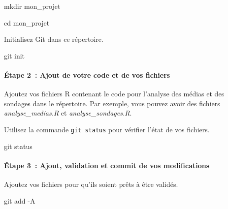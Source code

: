 \documentclass[
  letterpaper,
]{scrbook}
\let\oldparagraph\paragraph
\renewcommand{\paragraph}[1]{\oldparagraph{#1}\mbox{}}
\newenvironment{Shaded}{\begin{snugshade}}{\end{snugshade}}
\newcommand{\AttributeTok}[1]{\textcolor[rgb]{0.40,0.45,0.13}{#1}}
\newcommand{\BuiltInTok}[1]{\textcolor[rgb]{0.00,0.23,0.31}{#1}}
\newcommand{\FunctionTok}[1]{\textcolor[rgb]{0.28,0.35,0.67}{#1}}
\newcommand{\NormalTok}[1]{\textcolor[rgb]{0.00,0.23,0.31}{#1}}
\begin{document}
\begin{Shaded}
\begin{Highlighting}[]
\FunctionTok{mkdir}\NormalTok{ mon\_projet}
\end{Highlighting}
\end{Shaded}

\begin{Shaded}
\begin{Highlighting}[]
\BuiltInTok{cd}\NormalTok{ mon\_projet}
\end{Highlighting}
\end{Shaded}

Initialisez Git dans ce répertoire.

\begin{Shaded}
\begin{Highlighting}[]
\FunctionTok{git}\NormalTok{ init}
\end{Highlighting}
\end{Shaded}

\hypertarget{uxe9tape-2-ajout-de-votre-code-et-de-vos-fichiers}{%
\paragraph{Étape 2~: Ajout de votre code et de vos
fichiers}\label{uxe9tape-2-ajout-de-votre-code-et-de-vos-fichiers}}

Ajoutez vos fichiers R contenant le code pour l'analyse des médias et
des sondages dans le répertoire. Par exemple, vous pouvez avoir des
fichiers \emph{analyse\_medias.R} et \emph{analyse\_sondages.R}.

Utilisez la commande \texttt{git\ status} pour vérifier l'état de vos
fichiers.

\begin{Shaded}
\begin{Highlighting}[]
\FunctionTok{git}\NormalTok{ status}
\end{Highlighting}
\end{Shaded}

\hypertarget{uxe9tape-3-ajout-validation-et-commit-de-vos-modifications}{%
\paragraph{Étape 3~: Ajout, validation et commit de vos
modifications}\label{uxe9tape-3-ajout-validation-et-commit-de-vos-modifications}}

Ajoutez vos fichiers pour qu'ils soient prêts à être validés.

\begin{Shaded}
\begin{Highlighting}[]
\FunctionTok{git}\NormalTok{ add }\AttributeTok{{-}A}
\end{Highlighting}
\end{Shaded}
\end{document}
